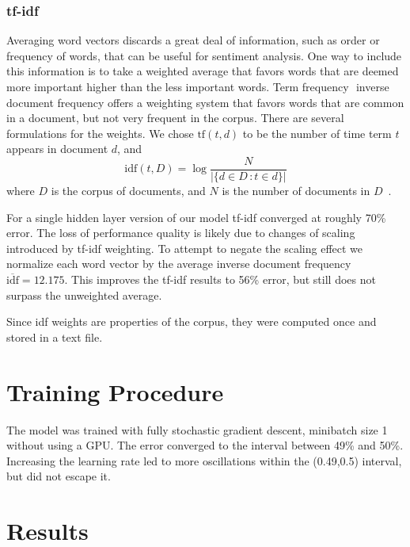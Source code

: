 \documentclass{article} %
\begin{document}
\subsubsection{tf-idf}
Averaging word vectors discards a great deal of information, such as order or frequency of words, that can be useful for sentiment analysis.
One way to include this information is to take a weighted average that favors words that are deemed more important higher than the less important words.
Term frequency \textendash\,\,inverse document frequency offers a weighting system that favors words that are common in a document, but not very frequent in the corpus. There are several formulations for the weights.
We chose $\textrm{tf}(t,d)$ to be the number of time term $t$ appears in document $d$, and 
\[
\textrm{idf}(t,D) = \log\frac{N}{|\{d \in D \,\colon t \in d\}|}
\]
where $D$ is the corpus of documents, and $N$ is the number of documents in $D$~\cite{manning12}.

For a single hidden layer version of our model tf-idf converged at roughly 70\% error.
The loss of performance quality is likely due to changes of scaling introduced by tf-idf weighting. To attempt to negate the scaling effect we normalize each word vector by the average inverse document frequency $\overline{\textrm{idf}} = 12.175$.
This improves the tf-idf results to 56\% error, but still does not surpass the unweighted average.

Since idf weights are properties of the corpus, they were computed once and stored in a text file.



\section{Training Procedure}
\label{train}
The model was trained with fully stochastic gradient descent, minibatch size 1 without using a GPU.
The error converged to the interval between 49\% and 50\%. Increasing the learning rate led to more oscillations within the (0.49,0.5) interval, but did not escape it.

\section{Results}
\label{results}
\end{document}
